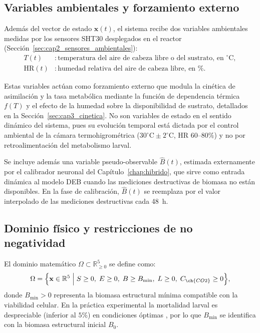 \subsection{Variables ambientales y forzamiento externo}
\label{subsec:cap3_forzamiento}

Además del vector de estado $\mathbf{x}(t)$, el sistema recibe dos variables ambientales medidas por los sensores SHT30 desplegados en el reactor (Sección~\ref{sec:cap2_sensores_ambientales}):
\begin{align}
    T(t) &: \text{temperatura del aire de cabeza libre o del sustrato, en } ^\circ\mathrm{C}, \\
    \mathrm{HR}(t) &: \text{humedad relativa del aire de cabeza libre, en \%}.
\end{align}

Estas variables actúan como forzamiento externo que modula la cinética de asimilación y la tasa metabólica mediante la función de dependencia térmica $f(T)$ y el efecto de la humedad sobre la disponibilidad de sustrato, detallados en la Sección~\ref{sec:cap3_cinetica}. No son variables de estado en el sentido dinámico del sistema, pues su evolución temporal está dictada por el control ambiental de la cámara termohigrométrica ($30^{\circ}\mathrm{C} \pm 2^{\circ}\mathrm{C}$, HR $60$--$80\%$) y no por retroalimentación del metabolismo larval.

Se incluye además una variable pseudo-observable $\hat{B}(t)$, estimada externamente por el calibrador neuronal del Capítulo~\ref{chap:hibrido}, que sirve como entrada dinámica al modelo DEB cuando las mediciones destructivas de biomasa no están disponibles. En la fase de calibración, $\hat{B}(t)$ se reemplaza por el valor interpolado de las mediciones destructivas cada 48~h.

\subsection{Dominio físico y restricciones de no negatividad}
\label{subsec:cap3_dominio}

El dominio matemático $\Omega \subset \mathbb{R}_{\geq 0}^{5}$ se define como:
\begin{equation}
    \Omega = \Bigl\{ \mathbf{x} \in \mathbb{R}^{5} \;\Big|\; S \geq 0,\; E \geq 0,\; B \geq B_{\min},\; L \geq 0,\; C_{\ch{CO2}} \geq 0 \Bigr\},
    \label{eq:cap3_dominio}
\end{equation}
donde $B_{\min} > 0$ representa la biomasa estructural mínima compatible con la viabilidad celular. En la práctica experimental la mortalidad larval es despreciable (inferior al $5\%$) en condiciones óptimas \parencite{salamEffectDifferentEnvironmental2022}, por lo que $B_{\min}$ se identifica con la biomasa estructural inicial $B_0$.

